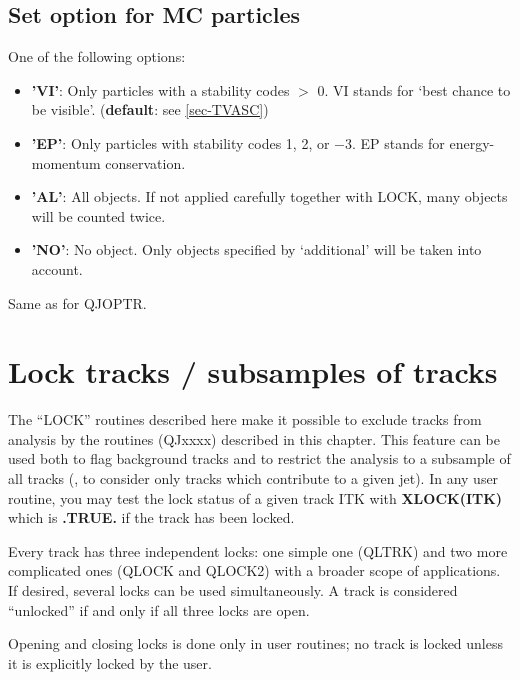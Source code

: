 \subsection{\label{sec-QJOMC}Set option for MC particles}
\par
{}
\par
\par
\begin{indentlist}{ 2.50cm}{ 2.75cm}
One of the following options:
\begin{itemize}
\item {\bf 'VI'}: Only particles with
a stability codes $>$ 0. VI stands for `best chance to be visible'.
({\bf default}: see \ref{sec-TVASC})
\item {\bf 'EP'}: Only particles with stability codes 1, 2, or $-$3.
EP stands for energy-momentum conservation.
\item {\bf 'AL'}: All objects. If not applied carefully together
with LOCK, many objects will be counted twice.
\item {\bf 'NO'}: No object. Only objects specified by
`additional' will be taken into account.
\end{itemize}
Same as for QJOPTR.
\end{indentlist}
 
\section{\label{sec-QL}Lock tracks / subsamples of tracks}
\par
The ``LOCK'' routines described here make it possible to exclude tracks
from analysis by the routines (QJxxxx) described in this chapter.
This
feature can be used both to flag background tracks and to
restrict the analysis to a subsample of all tracks (\eg, to consider
only tracks which contribute to a given jet).
In any user routine, you may test the lock status of a given
track ITK with {\bf XLOCK(ITK)} which is {\bf .TRUE.}
if the track has been locked.
\par
Every track has three independent locks: one simple one (QLTRK)
and two more complicated ones (QLOCK and QLOCK2)
with a broader scope of
applications. If desired, several locks can be used simultaneously.
A
track is considered ``unlocked'' if and only if all three locks are
open.
\par
Opening and closing locks is done only in user routines; no track
is locked unless it is explicitly locked by the user.
 
